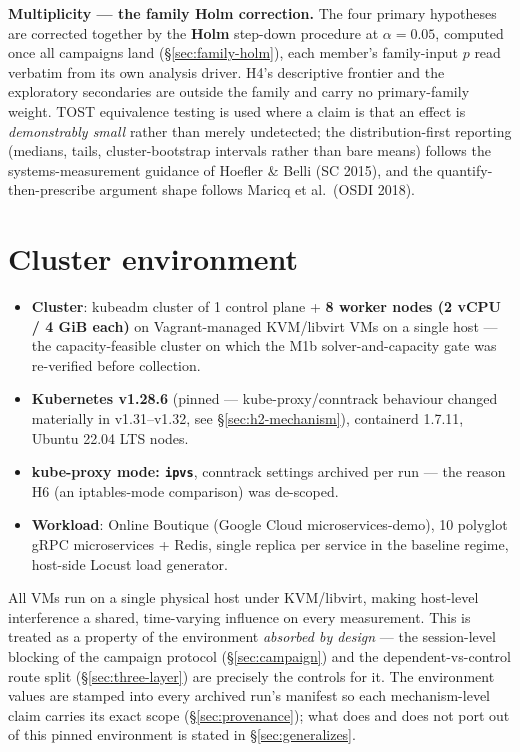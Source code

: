 \textbf{Multiplicity --- the family Holm correction.} The four primary
hypotheses are corrected together by the \textbf{Holm} step-down procedure at
$\alpha = 0.05$, computed once all campaigns land (\S\ref{sec:family-holm}),
each member's family-input $p$ read verbatim from its own analysis driver. H4's
descriptive frontier and the exploratory secondaries are outside the family and
carry no primary-family weight. TOST equivalence testing
\citep{schuirmann1987equivalence,lakens2017equivalence} is used where a claim is
that an effect is \emph{demonstrably small} rather than merely undetected; the
distribution-first reporting (medians, tails, cluster-bootstrap intervals rather
than bare means) follows the systems-measurement guidance of Hoefler \& Belli
(SC 2015), and the quantify-then-prescribe argument shape follows Maricq et
al.\ (OSDI 2018).

\section{Cluster environment}\label{sec:environment}


\begin{itemize}
\item \textbf{Cluster}: kubeadm cluster of 1 control plane + \textbf{8 worker
  nodes (2 vCPU / 4 GiB each)} on Vagrant-managed KVM/libvirt VMs on a single
  host --- the capacity-feasible cluster on which the M1b solver-and-capacity
  gate was re-verified before collection.
\item \textbf{Kubernetes v1.28.6} (pinned --- kube-proxy/conntrack behaviour
  changed materially in v1.31--v1.32, see \S\ref{sec:h2-mechanism}), containerd
  1.7.11, Ubuntu 22.04 LTS nodes.
\item \textbf{kube-proxy mode: \texttt{ipvs}}, conntrack settings archived per
  run --- the reason H6 (an iptables-mode comparison) was de-scoped.
\item \textbf{Workload}: Online Boutique (Google Cloud microservices-demo), 10
  polyglot gRPC microservices + Redis, single replica per service in the baseline
  regime, host-side Locust load generator.
\end{itemize}

All VMs run on a single physical host under KVM/libvirt, making host-level
interference a shared, time-varying influence on every measurement. This is
treated as a property of the environment \emph{absorbed by design} --- the
session-level blocking of the campaign protocol (\S\ref{sec:campaign}) and the
dependent-vs-control route split (\S\ref{sec:three-layer}) are precisely the
controls for it. The environment values are stamped into every archived run's
manifest so each mechanism-level claim carries its exact scope
(\S\ref{sec:provenance}); what does and does not port out of this pinned
environment is stated in \S\ref{sec:generalizes}.
